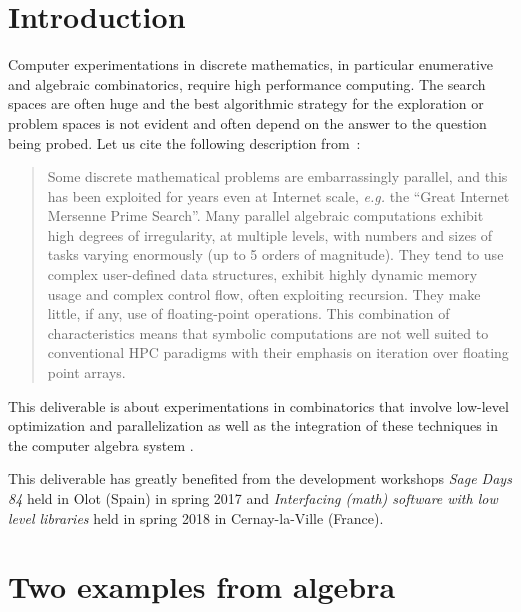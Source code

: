 \documentclass{deliverablereport}
\author{V. Delecroix, F. Hivert}
\begin{document}
\maketitle

\tableofcontents


\section{Introduction}

Computer experimentations in discrete mathematics, in particular
enumerative and algebraic combinatorics, require high performance
computing. The search spaces are often huge and the best algorithmic
strategy for the exploration or problem spaces is not evident and often depend on
the answer to the question being probed. Let us cite the following description
from~\cite{LoidlTrinder-Hecke}:
\begin{quote}{}
  Some discrete mathematical problems are embarrassingly parallel, and this
  has been exploited for years even at Internet scale, \emph{e.g.} the “Great
  Internet Mersenne Prime Search”.  Many parallel algebraic computations
  exhibit high degrees of irregularity, at multiple levels, with numbers and
  sizes of tasks varying enormously (up to 5 orders of magnitude). They tend
  to use complex user-defined data structures, exhibit highly dynamic memory
  usage and complex control flow, often exploiting recursion. They make
  little, if any, use of floating-point operations.  This combination of
  characteristics means that symbolic computations are not well suited to
  conventional HPC paradigms with their emphasis on iteration over floating
  point arrays.
\end{quote}

This deliverable is about experimentations in combinatorics
that involve low-level optimization and parallelization as
well as the integration of these techniques in the computer
algebra system \Sage.

This deliverable has greatly benefited from the \ODK development
workshops \textit{Sage Days 84} held in Olot (Spain) in spring 2017
and \textit{Interfacing (math) software with low level libraries}
held in spring 2018 in Cernay-la-Ville (France).


\section{Two examples from algebra}
\end{document}

